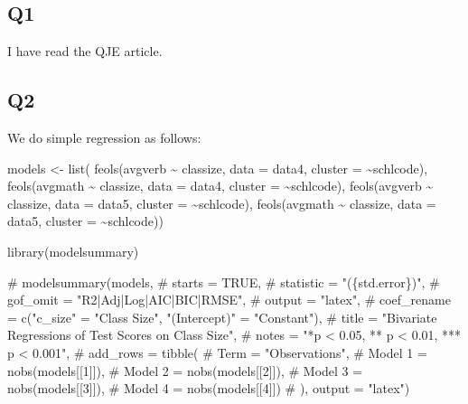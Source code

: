 \documentclass[
  letterpaper,
  DIV=11,
  numbers=noendperiod]{scrartcl}
\newenvironment{Shaded}{\begin{snugshade}}{\end{snugshade}}
\newcommand{\AttributeTok}[1]{\textcolor[rgb]{0.40,0.45,0.13}{#1}}
\newcommand{\CommentTok}[1]{\textcolor[rgb]{0.37,0.37,0.37}{#1}}
\newcommand{\FunctionTok}[1]{\textcolor[rgb]{0.28,0.35,0.67}{#1}}
\newcommand{\NormalTok}[1]{\textcolor[rgb]{0.00,0.23,0.31}{#1}}
\newcommand{\OtherTok}[1]{\textcolor[rgb]{0.00,0.23,0.31}{#1}}
\newcommand{\SpecialCharTok}[1]{\textcolor[rgb]{0.37,0.37,0.37}{#1}}
\begin{document}
\subsection{Q1}\label{q1}

I have read the QJE article.

\subsection{Q2}\label{q2}

We do simple regression as follows:

\begin{Shaded}
\begin{Highlighting}[]
\NormalTok{models }\OtherTok{\textless{}{-}} \FunctionTok{list}\NormalTok{(}
  \FunctionTok{feols}\NormalTok{(avgverb }\SpecialCharTok{\textasciitilde{}}\NormalTok{ classize, }\AttributeTok{data =}\NormalTok{ data4, }\AttributeTok{cluster =} \SpecialCharTok{\textasciitilde{}}\NormalTok{schlcode),}
  \FunctionTok{feols}\NormalTok{(avgmath }\SpecialCharTok{\textasciitilde{}}\NormalTok{ classize, }\AttributeTok{data =}\NormalTok{ data4, }\AttributeTok{cluster =} \SpecialCharTok{\textasciitilde{}}\NormalTok{schlcode),}
  \FunctionTok{feols}\NormalTok{(avgverb }\SpecialCharTok{\textasciitilde{}}\NormalTok{ classize, }\AttributeTok{data =}\NormalTok{ data5, }\AttributeTok{cluster =} \SpecialCharTok{\textasciitilde{}}\NormalTok{schlcode),}
  \FunctionTok{feols}\NormalTok{(avgmath }\SpecialCharTok{\textasciitilde{}}\NormalTok{ classize, }\AttributeTok{data =}\NormalTok{ data5, }\AttributeTok{cluster =} \SpecialCharTok{\textasciitilde{}}\NormalTok{schlcode))  }

\FunctionTok{library}\NormalTok{(modelsummary)}

\CommentTok{\# modelsummary(models,}
\CommentTok{\#   starts = TRUE,}
\CommentTok{\#   statistic = "(\{std.error\})",}
\CommentTok{\#   gof\_omit = "R2|Adj|Log|AIC|BIC|RMSE",}
\CommentTok{\#   output = "latex",}
\CommentTok{\#   coef\_rename = c("c\_size" = "Class Size", "(Intercept)" = "Constant"),}
\CommentTok{\#   title = "Bivariate Regressions of Test Scores on Class Size",}
\CommentTok{\#   notes = "*p \textless{} 0.05, ** p \textless{} 0.01, *** p \textless{} 0.001",}
\CommentTok{\#   add\_rows = tibble(}
\CommentTok{\#     Term = "Observations",}
\CommentTok{\#     \textasciigrave{}Model 1\textasciigrave{} = nobs(models[[1]]),}
\CommentTok{\#     \textasciigrave{}Model 2\textasciigrave{} = nobs(models[[2]]),}
\CommentTok{\#     \textasciigrave{}Model 3\textasciigrave{} = nobs(models[[3]]),}
\CommentTok{\#     \textasciigrave{}Model 4\textasciigrave{} = nobs(models[[4]])}
\CommentTok{\#   ), output = "latex")}


\end{Highlighting}
\end{Shaded}
\end{document}
